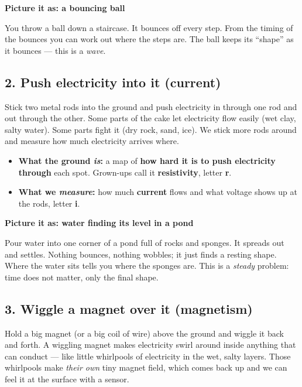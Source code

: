 \documentclass[11pt,a4paper]{article}
\newenvironment{storybox}[1]
  {\par\medskip\noindent
   \begin{lrbox}{\storyboxsave}
   \begin{minipage}{\dimexpr\linewidth-2\fboxsep-2\fboxrule\relax}
   \textbf{#1}\par\smallskip}
  {\end{minipage}\end{lrbox}%
   \fcolorbox{rule}{boxbg}{\usebox{\storyboxsave}}\par\medskip}
\begin{document}
\begin{storybox}{Picture it as: a bouncing ball}
You throw a ball down a staircase. It bounces off every step. From the timing of the
bounces you can work out where the steps are. The ball keeps its ``shape'' as it
bounces --- this is a \emph{wave}.
\end{storybox}

\subsection*{2. \textcolor{electric}{Push electricity into it} (current)}

Stick two metal rods into the ground and push electricity in through one rod and
out through the other. Some parts of the cake let electricity flow easily
(wet clay, salty water). Some parts fight it (dry rock, sand, ice).
We stick more rods around and measure how much electricity arrives where.

\begin{itemize}[leftmargin=2em]
  \item \textbf{What the ground \emph{is}:} a map of \textbf{how hard it is to push electricity through} each spot.
        Grown-ups call it \textbf{resistivity}, letter \textbf{r}.
  \item \textbf{What we \emph{measure}:} how much \textbf{current} flows and what voltage shows up at the rods,
        letter \textbf{i}.
\end{itemize}

\begin{storybox}{Picture it as: water finding its level in a pond}
Pour water into one corner of a pond full of rocks and sponges.
It spreads out and settles. Nothing bounces, nothing wobbles; it just finds a
resting shape. Where the water sits tells you where the sponges are.
This is a \emph{steady} problem: time does not matter, only the final shape.
\end{storybox}

\subsection*{3. \textcolor{magnet}{Wiggle a magnet over it} (magnetism)}

Hold a big magnet (or a big coil of wire) above the ground and wiggle it back and forth.
A wiggling magnet makes electricity swirl around inside anything that can conduct ---
like little whirlpools of electricity in the wet, salty layers.
Those whirlpools make \emph{their own} tiny magnet field, which comes back up
and we can feel it at the surface with a sensor.
\end{document}
